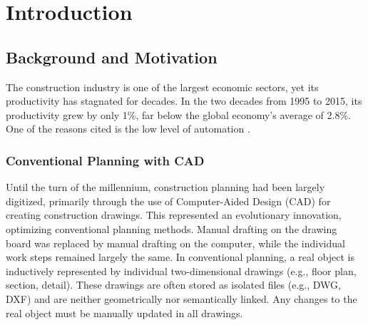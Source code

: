 \chapter{Introduction}
\label{sec:introduction}

\section{Background and Motivation}
The construction industry is one of the largest economic sectors, yet its productivity has stagnated for decades. In the two decades from 1995 to 2015, its productivity grew by only 1\%, far below the global economy's average of 2.8\%. One of the reasons cited is the low level of automation \cite{barbosaReinventingConstructionRoute2017}.

\begin{comment}
Als einer der Gründe wird die geringe Automatisierung genannt. Bis zur Jahrtausendwende war die Bauplanung weitgehendst digitalisiert, insbesondere durch den Einsatz von Computer Aided Design (CAD) für die Erstellung von Bauzeichnungen. Es handelte sich um eine evolutionäre innovation, bei der die konventionelle planung optimiert wurde. Das manuelle Zeichnen am reissbrett wurde durch manuelles zeichnen am computer ersetzt, die einzelnen arbeitsschritte blieben weitgehnd dieselben. Bei der konventionelle planung wird ein reales objekt induktiv durch einzelne, zweidimensionale zeichnungen (z.B. grundriss, schnitt, detail) abgebildet. Die zeichnungen werden oft als isolierte dateien (z.B. dwg, dxf) gespeichert und sind dabei weder geometrisch noch semantisch miteinander verknüpft. änderungen am realen objekt müssen in allen zeichnungen manuell vorgenommen werden. \\
\end{comment}
\subsection{Conventional Planning with CAD}
Until the turn of the millennium, construction planning had been largely digitized, primarily through the use of Computer-Aided Design (CAD) for creating construction drawings. This represented an evolutionary innovation, optimizing conventional planning methods. Manual drafting on the drawing board was replaced by manual drafting on the computer, while the individual work steps remained largely the same. In conventional planning, a real object is inductively represented by individual two-dimensional drawings (e.g., floor plan, section, detail). These drawings are often stored as isolated files (e.g., DWG, DXF) and are neither geometrically nor semantically linked. Any changes to the real object must be manually updated in all drawings. \\

